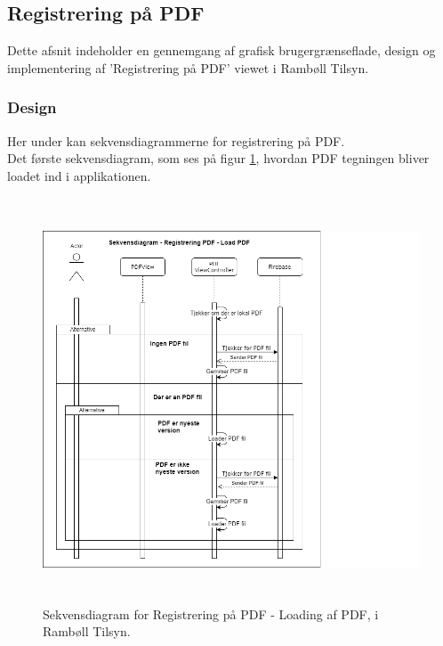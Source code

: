 \subsection{Registrering på PDF}\label{sec:PDF}
Dette afsnit indeholder en gennemgang af grafisk brugergrænseflade, design og implementering af 'Registrering på PDF' viewet i Rambøll Tilsyn.

\subsubsection{Design}
Her under kan sekvensdiagrammerne for registrering på PDF. \\
Det første sekvensdiagram, som ses på figur \ref{fig:LoadPDFSekvensDiagram}, hvordan PDF tegningen bliver loadet ind i applikationen.
\begin{figure}[H] %
	\centering
	\includegraphics[height=12cm, width=15cm]{../ArkitekturDesign/Design/RegisterPDF/LoadPDFSekvensDiagram}
	\caption{Sekvensdiagram for Registrering på PDF - Loading af PDF, i Rambøll Tilsyn.}
	\label{fig:LoadPDFSekvensDiagram}
\end{figure}

\clearpage


